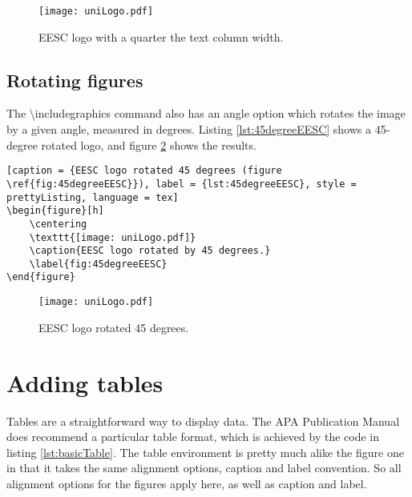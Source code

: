 \begin{figure}[h]
	\centering
	\texttt{[image: uniLogo.pdf]}
	\caption{EESC logo with a quarter the text column width.}
	\label{fig:quarterTextEESC}
\end{figure}

	\subsection{Rotating figures}

	The  {\ttfamily\small \textbackslash includegraphics} command also has an {\ttfamily angle} option which rotates the image by a given angle, measured in degrees. Listing \ref{lst:45degreeEESC} shows a 45-degree rotated logo, and figure \ref{fig:45degreeEESC} shows the results.

\begin{lstlisting}[caption = {EESC logo rotated 45 degrees (figure \ref{fig:45degreeEESC}}), label = {lst:45degreeEESC}, style = prettyListing, language = tex]
\begin{figure}[h]
	\centering
	\texttt{[image: uniLogo.pdf]}
	\caption{EESC logo rotated by 45 degrees.}
	\label{fig:45degreeEESC}
\end{figure}
\end{lstlisting}

\begin{figure}[h]
	\centering
	\texttt{[image: uniLogo.pdf]}
	\caption{EESC logo rotated 45 degrees.}
	\label{fig:45degreeEESC}
\end{figure}

	\section{Adding tables}

	Tables are a straightforward way to display data. The APA Publication Manual does recommend a particular table format, which is achieved by the code in listing \ref{lst:basicTable}. The {\ttfamily table} environment is pretty much alike the figure one in that it takes the same alignment options, caption and label convention. So all alignment options for the figures apply here, as well as caption and label.

